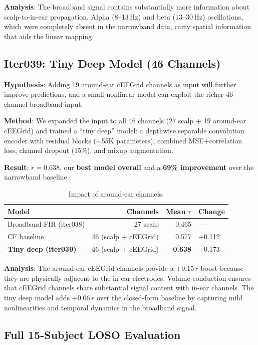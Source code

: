 \documentclass[11pt,a4paper]{article}
\begin{document}
\textbf{Analysis}: The broadband signal contains substantially more
information about scalp-to-in-ear propagation. Alpha (8--13\,Hz) and beta
(13--30\,Hz) oscillations, which were completely absent in the narrowband
data, carry spatial information that aids the linear mapping.

\subsection{Iter039: Tiny Deep Model (46 Channels)}

\textbf{Hypothesis}: Adding 19 around-ear cEEGrid channels as input will
further improve predictions, and a small nonlinear model can exploit the
richer 46-channel broadband input.

\textbf{Method}: We expanded the input to all 46 channels (27 scalp +
19 around-ear cEEGrid) and trained a ``tiny deep'' model: a depthwise
separable convolution encoder with residual blocks ($\sim$55K parameters),
combined MSE+correlation loss, channel dropout (15\%), and mixup
augmentation.

\textbf{Result}: $r = 0.638$, our \textbf{best model overall} and a
\textbf{69\% improvement} over the narrowband baseline.

\begin{table}[H]
\centering
\caption{Impact of around-ear channels.}
\begin{tabular}{lrrl}
\toprule
Model & Channels & Mean $r$ & Change \\
\midrule
Broadband FIR (iter038) & 27 scalp & 0.465 & --- \\
CF baseline & 46 (scalp + cEEGrid) & 0.577 & +0.112 \\
\textbf{Tiny deep (iter039)} & 46 (scalp + cEEGrid) & \textcolor{good}{\textbf{0.638}} & \textcolor{good}{+0.173} \\
\bottomrule
\end{tabular}
\end{table}

\textbf{Analysis}: The around-ear cEEGrid channels provide a $+0.15\,r$
boost because they are physically adjacent to the in-ear electrodes.
Volume conduction ensures that cEEGrid channels share substantial signal
content with in-ear channels. The tiny deep model adds $+0.06\,r$ over
the closed-form baseline by capturing mild nonlinearities and temporal
dynamics in the broadband signal.

\subsection{Full 15-Subject LOSO Evaluation}
\end{document}
